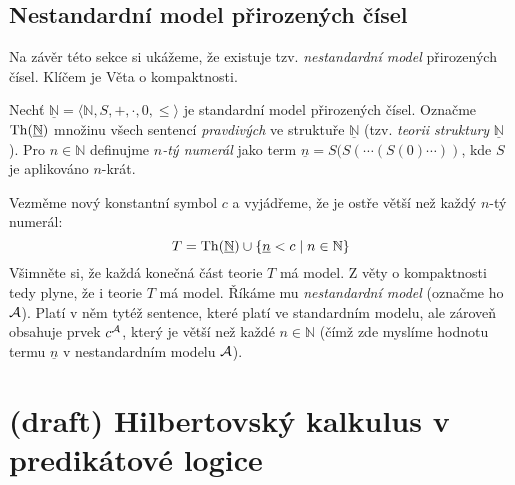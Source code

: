 \subsection{Nestandardní model přirozených čísel}

Na závěr této sekce si ukážeme, že existuje tzv. \emph{nestandardní model} přirozených čísel. Klíčem je Věta o kompaktnosti.
    
Nechť $\underline{\mathbb N}=\langle\mathbb N,S,+,\cdot,0,\leq\rangle$ je standardní model přirozených čísel. Označme $\operatorname{Th}(\underline{\mathbb N})$ množinu všech sentencí \emph{pravdivých} ve struktuře $\underline{\mathbb N}$ (tzv. \emph{teorii struktury} $\underline{\mathbb N}$). Pro $n\in \mathbb N$ definujme \emph{$n$-tý numerál} jako term $\underline n=S(S(\cdots (S(0)\cdots))$, kde $S$ je aplikováno $n$-krát.

Vezměme nový konstantní symbol $c$ a vyjádřeme, že je ostře větší než každý $n$-tý numerál:
$$
T=\operatorname{Th}(\underline{\mathbb N})\cup\{\underline n<c\mid n\in \mathbb N\}
$$
Všimněte si, že každá konečná část teorie $T$ má model. Z věty o kompaktnosti tedy plyne, že i teorie $T$ má model. Říkáme mu \emph{nestandardní model} (označme ho $\mathcal{A}$). Platí v něm tytéž sentence, které platí ve standardním modelu, ale zároveň obsahuje prvek $c^{\mathcal{A}}$, který je větší než každé $n\in \mathbb N$ (čímž zde myslíme hodnotu termu $\underline n$ v nestandardním modelu $\mathcal{A}$).
    

\section{(draft) Hilbertovský kalkulus v predikátové logice}\todo

